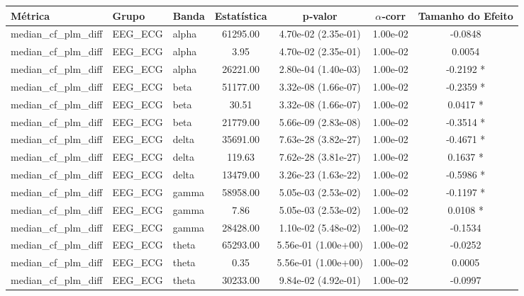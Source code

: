 \begin{table}[htbp]
  \centering
  \begin{tabular}{l l l c c c c}
    \toprule
    Métrica & Grupo & Banda & Estatística & p‑valor & $\alpha$‑corr & Tamanho do Efeito \\
    \midrule
    median\_cf\_plm\_diff & EEG\_ECG & alpha & 61295.00 & 4.70e-02 (2.35e-01) & 1.00e-02 & -0.0848  \\
    median\_cf\_plm\_diff & EEG\_ECG & alpha & 3.95 & 4.70e-02 (2.35e-01) & 1.00e-02 & 0.0054  \\
    median\_cf\_plm\_diff & EEG\_ECG & alpha & 26221.00 & 2.80e-04 (1.40e-03) & 1.00e-02 & -0.2192 * \\
    median\_cf\_plm\_diff & EEG\_ECG & beta & 51177.00 & 3.32e-08 (1.66e-07) & 1.00e-02 & -0.2359 * \\
    median\_cf\_plm\_diff & EEG\_ECG & beta & 30.51 & 3.32e-08 (1.66e-07) & 1.00e-02 & 0.0417 * \\
    median\_cf\_plm\_diff & EEG\_ECG & beta & 21779.00 & 5.66e-09 (2.83e-08) & 1.00e-02 & -0.3514 * \\
    median\_cf\_plm\_diff & EEG\_ECG & delta & 35691.00 & 7.63e-28 (3.82e-27) & 1.00e-02 & -0.4671 * \\
    median\_cf\_plm\_diff & EEG\_ECG & delta & 119.63 & 7.62e-28 (3.81e-27) & 1.00e-02 & 0.1637 * \\
    median\_cf\_plm\_diff & EEG\_ECG & delta & 13479.00 & 3.26e-23 (1.63e-22) & 1.00e-02 & -0.5986 * \\
    median\_cf\_plm\_diff & EEG\_ECG & gamma & 58958.00 & 5.05e-03 (2.53e-02) & 1.00e-02 & -0.1197 * \\
    median\_cf\_plm\_diff & EEG\_ECG & gamma & 7.86 & 5.05e-03 (2.53e-02) & 1.00e-02 & 0.0108 * \\
    median\_cf\_plm\_diff & EEG\_ECG & gamma & 28428.00 & 1.10e-02 (5.48e-02) & 1.00e-02 & -0.1534  \\
    median\_cf\_plm\_diff & EEG\_ECG & theta & 65293.00 & 5.56e-01 (1.00e+00) & 1.00e-02 & -0.0252  \\
    median\_cf\_plm\_diff & EEG\_ECG & theta & 0.35 & 5.56e-01 (1.00e+00) & 1.00e-02 & 0.0005  \\
    median\_cf\_plm\_diff & EEG\_ECG & theta & 30233.00 & 9.84e-02 (4.92e-01) & 1.00e-02 & -0.0997  \\
    \bottomrule
  \end{tabular}
\end{table}
